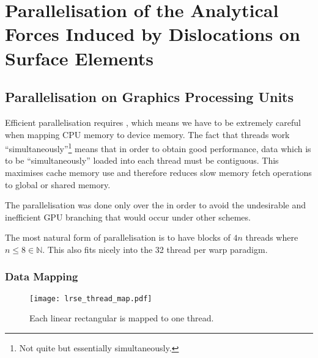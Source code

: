 \chapter{Parallelisation of the Analytical Forces Induced by Dislocations on Surface Elements}
\label{c:para_f_dln_se}
	\section{Parallelisation on Graphics Processing Units}
	Efficient parallelisation requires , which means we have to be extremely careful when mapping CPU memory to device memory. The fact that threads work ``simultaneously''\footnote{Not quite but essentially simultaneously.} means that in order to obtain good performance, data which is to be ``simultaneously'' loaded into each thread must be contiguous. This maximises cache memory use and therefore reduces slow memory fetch operations to global or shared memory.
	
	The parallelisation was done only over the  in order to avoid the undesirable and inefficient GPU branching that would occur under other schemes.
	
	The most natural form of parallelisation is to have blocks of $ 4n $ threads where $ n \leq 8 \in \mathbb{N}$. This also fits nicely into the 32 thread per warp paradigm.
	\subsection{Data Mapping}
		\begin{figure}
			\centering
			\texttt{[image: lrse\_thread\_map.pdf]}
			\caption[Linear rectangular surface element mapping.]{Each linear rectangular  is mapped to one thread.}
			\label{f:lrse_map}
		\end{figure}
